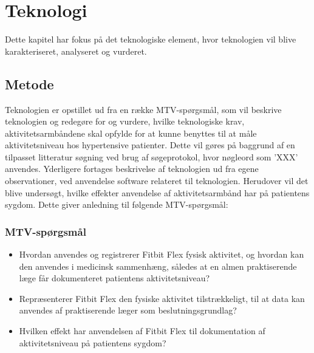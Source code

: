 \chapter{Teknologi}
Dette kapitel har fokus på det teknologiske element, hvor teknologien vil blive karakteriseret, analyseret og vurderet.
\section{Metode}
Teknologien er opstillet ud fra en række MTV-spørgsmål, som vil beskrive teknologien og redegøre for og vurdere, hvilke teknologiske krav, aktivitetsarmbåndene skal opfylde for at kunne benyttes til at måle aktivitetsniveau hos hypertensive patienter. 
Dette vil gøres på baggrund af en tilpasset litteratur søgning ved brug af søgeprotokol, hvor nøgleord som 'XXX' anvendes. 
Yderligere fortages beskrivelse af teknologien ud fra egene observationer, ved anvendelse software relateret til teknologien.   
Herudover vil det blive undersøgt, hvilke effekter anvendelse af aktivitetsarmbånd har på patientens sygdom. 
Dette giver anledning til følgende MTV-spørgsmål: 
\subsection{MTV-spørgsmål}
\begin{itemize}
\item Hvordan anvendes og registrerer Fitbit Flex fysisk aktivitet, og hvordan kan den anvendes i medicinsk sammenhæng, således at en almen praktiserende læge får dokumenteret patientens aktivitetsniveau?
\item Repræsenterer Fitbit Flex den fysiske aktivitet tilstrækkeligt, til at data kan anvendes af praktiserende læger som beslutningsgrundlag?
\item Hvilken effekt har anvendelsen af Fitbit Flex til dokumentation af aktivitetsniveau på patientens sygdom?
\end{itemize}








